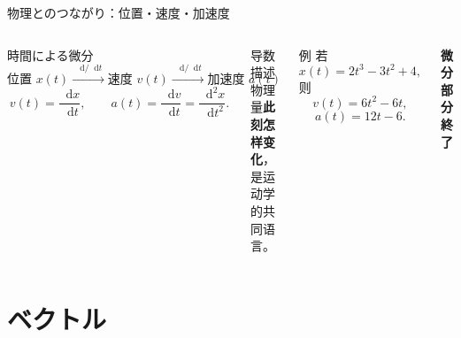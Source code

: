 \documentclass[notheorems,aspectratio=169]{beamer}
\newcommand{\key}[1]{\textbf{\color{ChinaRed}#1}}
\newcommand{\dd}{\mathop{}\!\mathrm{d}}
\begin{document}
\begin{frame}{物理とのつながり：位置・速度・加速度}
  \begin{columns}[T,onlytextwidth]
    \begin{block}{時間による微分}
      \[
        \text{位置 }x(t)
        \xrightarrow{\;\dd/\dd t\;}
        \text{速度 }v(t)
        \xrightarrow{\;\dd/\dd t\;}
        \text{加速度 }a(t)
      \]
      \[
        v(t)=\frac{\dd x}{\dd t},\qquad
        a(t)=\frac{\dd v}{\dd t}=\frac{\dd^2x}{\dd t^2}.
      \]
    \end{block}
    导数描述物理量\key{此刻怎样变化}，是运动学的共同语言。

    \begin{alertblock}{例}
      若
      \[
        x(t)=2t^3-3t^2+4,
      \]
      则
      \[
        v(t)=6t^2-6t,
      \]
      \[
        a(t)=12t-6.
      \]
    \end{alertblock}
    \begin{center}
      \key{微分部分終了}
    \end{center}
  \end{columns}
\end{frame}

\section{ベクトル}
\end{document}
